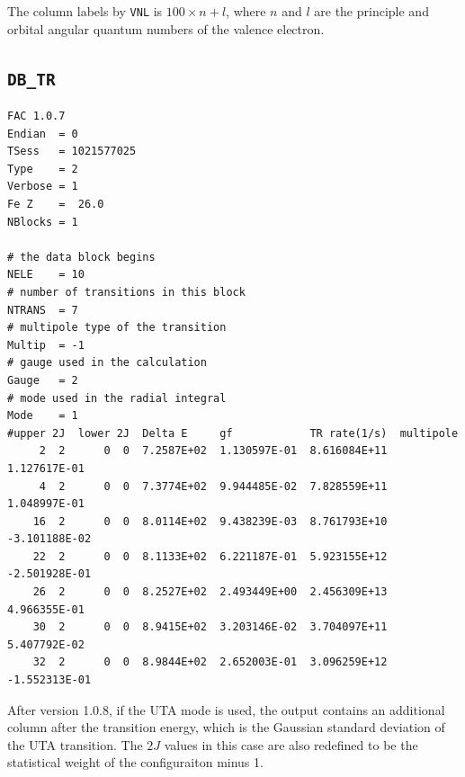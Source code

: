 \documentclass[twoside,letterpaper]{refrep}
\begin{document}
The column labels by \verb|VNL| is $100\times n + l$, where $n$ and $l$ 
are the principle and orbital angular quantum numbers of the valence 
electron.

\subsection{\texttt{DB\_TR}}
\begin{verbatim}
FAC 1.0.7
Endian	= 0
TSess	= 1021577025
Type	= 2
Verbose	= 1
Fe Z	=  26.0
NBlocks	= 1

# the data block begins
NELE	= 10
# number of transitions in this block
NTRANS	= 7
# multipole type of the transition
Multip	= -1
# gauge used in the calculation
Gauge	= 2
# mode used in the radial integral
Mode	= 1
#upper 2J  lower 2J  Delta E     gf            TR rate(1/s)  multipole
     2  2      0  0  7.2587E+02  1.130597E-01  8.616084E+11  1.127617E-01
     4  2      0  0  7.3774E+02  9.944485E-02  7.828559E+11  1.048997E-01
    16  2      0  0  8.0114E+02  9.438239E-03  8.761793E+10 -3.101188E-02
    22  2      0  0  8.1133E+02  6.221187E-01  5.923155E+12 -2.501928E-01
    26  2      0  0  8.2527E+02  2.493449E+00  2.456309E+13  4.966355E-01
    30  2      0  0  8.9415E+02  3.203146E-02  3.704097E+11  5.407792E-02
    32  2      0  0  8.9844E+02  2.652003E-01  3.096259E+12 -1.552313E-01
\end{verbatim}

After version 1.0.8, if the UTA mode is used, the output contains an
additional column after the transition energy, which is the Gaussian standard
deviation of the UTA transition. The $2J$ values in this case are also
redefined to be the statistical weight of the configuraiton minus 1.
\end{document}
